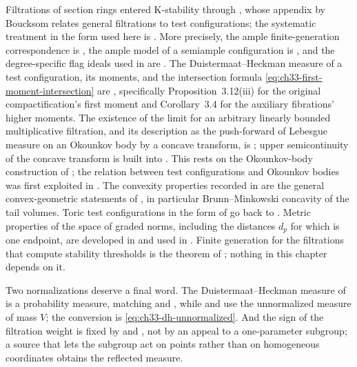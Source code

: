Filtrations of section rings entered K-stability through
\cite{Sze15}, whose appendix by Boucksom relates general filtrations to
test configurations; the systematic treatment in the form used here is
\cite[\S2]{BHJ17}.  More precisely, the ample finite-generation
correspondence is \cite[Proposition~2.15]{BHJ17}, the ample model of a
semiample configuration is \cite[Proposition~2.17]{BHJ17}, and the
degree-specific flag ideals used in
 are
\cite[Definition~2.19 and Proposition~2.21]{BHJ17}.  The
Duistermaat--Heckman measure of a test
configuration, its moments, and the intersection formula
\eqref{eq:ch33-first-moment-intersection} are \cite[\S3]{BHJ17},
specifically Proposition~3.12(iii) for the original compactification's
first moment and Corollary~3.4 for the auxiliary fibrations' higher moments.  The existence of the limit for an
arbitrary linearly bounded multiplicative filtration, and its description as
the push-forward of Lebesgue measure on an Okounkov body by a concave
transform, is \cite[Theorem~A]{BC11}; upper semicontinuity of the concave
transform is built into \cite[Definition~1.8]{BC11}.  This rests on the Okounkov-body
construction of \cite{Oko03,LM09,KK12}; the relation between test
configurations and Okounkov bodies was first exploited in \cite{WN12}.  The
convexity properties recorded in  are the
general convex-geometric statements of , in particular
Brunn--Minkowski concavity of the tail volumes.  Toric test configurations in the form of
 go back to \cite{Don02}.  Metric properties of the space
of graded norms, including the distances $d_p$ for which
 is one endpoint, are developed in
\cite{BJKS1} and used in .  Finite generation for
the filtrations that compute stability thresholds is the theorem of
\cite{LXZ22}; nothing in this chapter depends on it.

Two normalizations deserve a final word.  The Duistermaat--Heckman measure
of  is a probability measure, matching
\cite{BHJ17} and , while
 and  use the
unnormalized measure of mass $V$; the conversion is
\eqref{eq:ch33-dh-unnormalized}.  And the sign of the filtration weight is
fixed by  and
, not by an appeal to a one-parameter subgroup;
a source that lets the subgroup act on points rather than on homogeneous
coordinates obtains the reflected measure.
